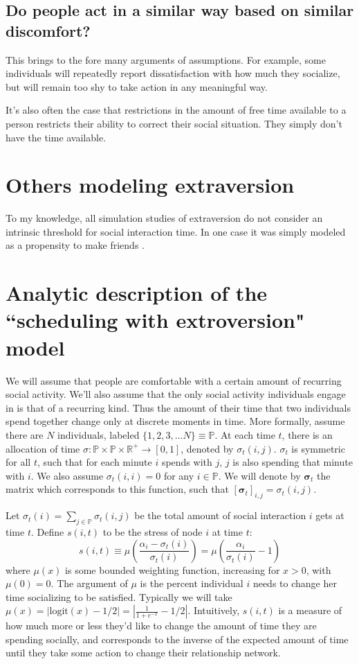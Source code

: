 \documentclass[]{article}
\begin{document}
	\subsection{Do people act in a similar way based on similar discomfort?}
	This brings to the fore many arguments of assumptions. 
	For example, some individuals will repeatedly report dissatisfaction with how much they socialize, but will remain too shy to take action in any meaningful way.
	
	It's also often the case that restrictions in the amount of free time available to a person restricts their ability to correct their social situation. They simply don't have the time available.
	
	\section{Others modeling extraversion}
	To my knowledge, all simulation studies of extraversion do not consider an intrinsic threshold for social interaction time. In one case it was simply modeled as a propensity to make friends \cite{Muthukrishna}.
	
	\section{Analytic description of the ``scheduling with extroversion" model}
	We will assume that people are comfortable with a certain amount of recurring social activity. 
	We'll also assume that the only social activity individuals engage in is that of a recurring kind.
	Thus the amount of their time that two individuals spend together change only at discrete moments in time.
	More formally, assume there are $N$ individuals, labeled $\{1,2,3,\dots N\} \equiv \mathbb{P}$.
	At each time $t$, there is an allocation of time $\sigma: \mathbb{P} \times \mathbb{P} \times \mathbb{R^+} \to [0,1]$, denoted by $\sigma_t(i,j)$. $\sigma_t$ is symmetric for all $t$, such that for each minute $i$ spends with $j$, $j$ is also spending that minute with $i$. We also assume $\sigma_t(i,i) = 0$ for any $i\in\mathbb{P}$. We will denote by $\boldsymbol{\sigma}_t$ the matrix which corresponds to this function, such that $[\boldsymbol{\sigma}_t]_{i,j} = \sigma_t(i,j)$.
	
	Let $\sigma_t(i) = \sum_{j\in\mathbb{P}} \sigma_t(i, j)$ be the total amount of social interaction $i$ gets at time $t$.
	Define $s(i,t)$ to be the stress of node $i$ at time $t$:
	\[
	s(i,t) \equiv \mu\left( \frac{\alpha_i - \sigma_t(i)}{\sigma_t(i)} \right) = \mu\left( \frac{\alpha_i}{\sigma_t(i)} - 1 \right)
	\]
	where $\mu(x)$ is some bounded weighting function, increasing for $x > 0$, with $\mu(0) = 0$. The argument of $\mu$ is the percent individual $i$ needs to change her time socializing to be satisfied. 
	Typically we will take $\mu(x) = |\text{logit}(x) - 1/2| = |\frac{1}{1+e^{-x}} - 1/2|$.
	Intuitively, $s(i,t)$ is a measure of how much more or less they'd like to change the amount of time they are spending socially, and corresponds to the inverse of the expected amount of time until they take some action to change their relationship network.
	
\end{document}
